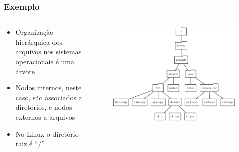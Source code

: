 \documentclass[aspectratio=169]{beamer}
\begin{document}
\begin{frame}\frametitle{Exemplo}
\begin{columns}[T]
\begin{column}{0.4\linewidth}
\begin{itemize}
	\item Organização hierárquica dos arquivos nos sistemas operacionais é uma árvore
	\item Nodos internos, neste caso, são associados a diretórios, e nodos externos a arquivos
	\item No Linux o diretório raiz é “/”
\end{itemize}
\end{column}
\begin{column}{0.6\linewidth}
\vspace{-5mm}
\begin{figure}[h]
	\centering
	\includegraphics[height=0.7\paperheight]{imagens/arvore4.eps}
\end{figure}
\end{column}
\end{columns}
\end{frame}
\end{document}
